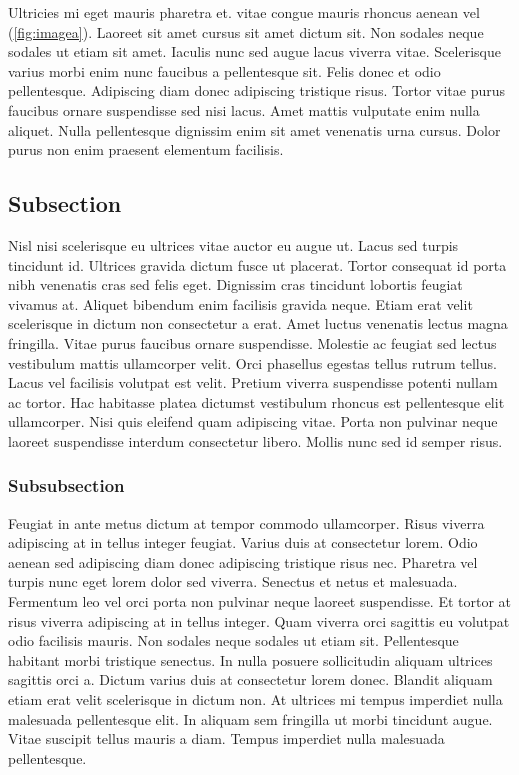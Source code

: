 \documentclass{jov}
\begin{document}
	Ultricies mi eget mauris pharetra et.  vitae congue mauris rhoncus aenean vel (\autoref{fig:imagea}). Laoreet sit amet cursus sit amet dictum sit. Non sodales neque sodales ut etiam sit amet. Iaculis nunc sed augue lacus viverra vitae. Scelerisque varius morbi enim nunc faucibus a pellentesque sit. Felis donec et odio pellentesque. Adipiscing diam donec adipiscing tristique risus. Tortor vitae purus faucibus ornare suspendisse sed nisi lacus. Amet mattis vulputate enim nulla aliquet. Nulla pellentesque dignissim enim sit amet venenatis urna cursus. Dolor purus non enim praesent elementum facilisis.
	
	\subsection{Subsection}
	Nisl nisi scelerisque eu ultrices vitae auctor eu augue ut. Lacus sed turpis tincidunt id. Ultrices gravida dictum fusce ut placerat. Tortor consequat id porta nibh venenatis cras sed felis eget. Dignissim cras tincidunt lobortis feugiat vivamus at. Aliquet bibendum enim facilisis gravida neque. Etiam erat velit scelerisque in dictum non consectetur a erat. Amet luctus venenatis lectus magna fringilla. Vitae purus faucibus ornare suspendisse. Molestie ac feugiat sed lectus vestibulum mattis ullamcorper velit. Orci phasellus egestas tellus rutrum tellus. Lacus vel facilisis volutpat est velit. Pretium viverra suspendisse potenti nullam ac tortor. Hac habitasse platea dictumst vestibulum rhoncus est pellentesque elit ullamcorper. Nisi quis eleifend quam adipiscing vitae. Porta non pulvinar neque laoreet suspendisse interdum consectetur libero. Mollis nunc sed id semper risus.
	
	\subsubsection{Subsubsection}
	Feugiat in ante metus dictum at tempor commodo ullamcorper. Risus viverra adipiscing at in tellus integer feugiat. Varius duis at consectetur lorem. Odio aenean sed adipiscing diam donec adipiscing tristique risus nec. Pharetra vel turpis nunc eget lorem dolor sed viverra. Senectus et netus et malesuada. Fermentum leo vel orci porta non pulvinar neque laoreet suspendisse. Et tortor at risus viverra adipiscing at in tellus integer. Quam viverra orci sagittis eu volutpat odio facilisis mauris. Non sodales neque sodales ut etiam sit. Pellentesque habitant morbi tristique senectus. In nulla posuere sollicitudin aliquam ultrices sagittis orci a. Dictum varius duis at consectetur lorem donec. Blandit aliquam etiam erat velit scelerisque in dictum non. At ultrices mi tempus imperdiet nulla malesuada pellentesque elit. In aliquam sem fringilla ut morbi tincidunt augue. Vitae suscipit tellus mauris a diam. Tempus imperdiet nulla malesuada pellentesque.
		
\end{document}
